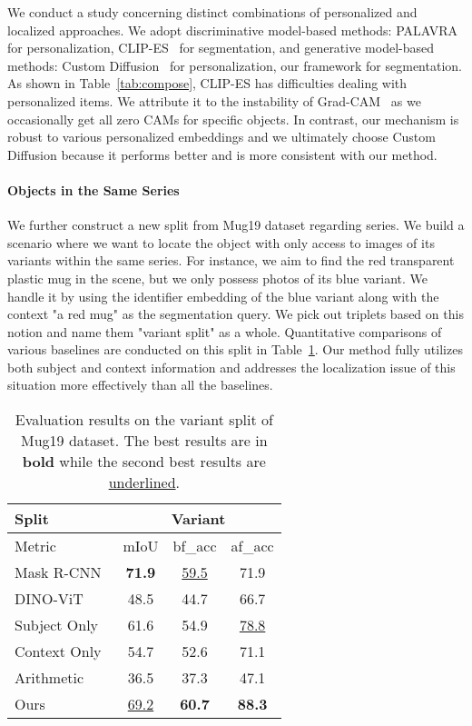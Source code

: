 \documentclass[letterpaper]{article} \usepackage[submission]{aaai24}  \usepackage{times}  \usepackage{helvet}  \usepackage{courier}  \usepackage[hyphens]{url}  \usepackage{graphicx} \urlstyle{rm} \def\UrlFont{\rm}  \usepackage{natbib}  \usepackage{caption} \frenchspacing  \setlength{\pdfpagewidth}{8.5in} \setlength{\pdfpageheight}{11in} \usepackage{algorithm}
\begin{document}
We conduct a study concerning distinct combinations of personalized and localized approaches.
We adopt discriminative model-based methods: PALAVRA~\cite{PALAVRA} for personalization, CLIP-ES~\cite{CLIP-ES} for segmentation, and generative model-based methods: Custom Diffusion~\cite{customdiffusion} for personalization, our framework for segmentation.
As shown in Table~\ref{tab:compose}, CLIP-ES has difficulties dealing with personalized items.
We attribute it to the instability of Grad-CAM~\cite{gradcam} as we occasionally get all zero CAMs for specific objects.
In contrast, our mechanism is robust to various personalized embeddings and we ultimately choose Custom Diffusion because it performs better and is more consistent with our method.

\paragraph{Objects in the Same Series}

We further construct a new split from Mug19 dataset regarding series.
We build a scenario where we want to locate the object with only access to images of its variants within the same series. 
For instance, we aim to find the red transparent plastic mug in the scene, but we only possess photos of its blue variant.
We handle it by using the identifier embedding of the blue variant along with the context "a red mug" as the segmentation query.
We pick out  triplets based on this notion and name them "variant split" as a whole.
Quantitative comparisons of various baselines are conducted on this split in Table~\ref{tab:variant}.
Our method fully utilizes both subject and context information and addresses the localization issue of this situation more effectively than all the baselines.
\begin{table}
  \centering
  \setlength\tabcolsep{4.5pt}
  \begin{tabular}{l|ccc}
    \hline
    Split  & \multicolumn{3}{c}{Variant} \\
    \hline
    Metric  & mIoU & bf\_acc & af\_acc \\
    \hline
    Mask R-CNN~\cite{maskrcnn}       & \textbf{71.9} & \underline{59.5} & 71.9 \\
    DINO-ViT~\cite{dino}       & 48.5 & 44.7 & 66.7 \\
    Subject Only       & 61.6 & 54.9 & \underline{78.8} \\
Context Only      & 54.7 & 52.6 & 71.1 \\
    Arithmetic & 36.5 & 37.3 & 47.1 \\
    Ours & \underline{69.2} & \textbf{60.7} & \textbf{88.3} \\
\hline
  \end{tabular}
  \caption{Evaluation results on the variant split of Mug19 dataset. The best results are in \textbf{bold} while the second best results are \underline{underlined}.}
  \label{tab:variant}
\end{table}
\end{document}
